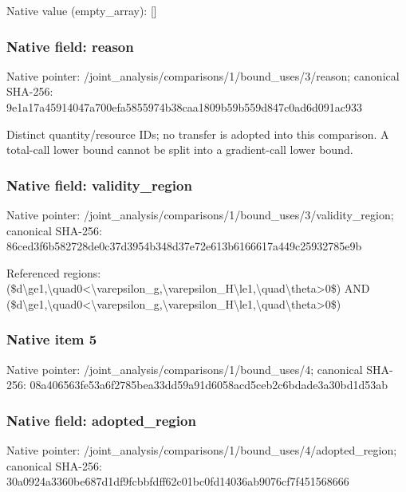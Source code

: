 \documentclass[10pt,a4paper]{article}
\begin{document}
Native value (empty\_\allowbreak{}array): []

\subsubsection{Native field: reason}
Native pointer: /joint\_\allowbreak{}analysis/comparisons/1/bound\_\allowbreak{}uses/3/reason; canonical SHA-256: 9e1a17a45914047a700efa5855974b38caa1809b59b559d847c0ad6d091ac933

\begingroup\raggedright\sloppy Distinct quantity/\allowbreak{}resource IDs;\allowbreak{} no transfer is adopted into this comparison. A total-call lower bound cannot be split into a gradient-call lower bound.\par\endgroup

\subsubsection{Native field: validity\_\allowbreak{}region}
Native pointer: /joint\_\allowbreak{}analysis/comparisons/1/bound\_\allowbreak{}uses/3/validity\_\allowbreak{}region; canonical SHA-256: 86ced3f6b582728de0c37d3954b348d37e72e613b6166617a449c25932785e9b

\begingroup\raggedright\sloppy Referenced regions:\allowbreak{} (\$d\textbackslash{}ge1,\allowbreak{}\textbackslash{}quad0<\textbackslash{}varepsilon\_\allowbreak{}g,\allowbreak{}\textbackslash{}varepsilon\_\allowbreak{}H\textbackslash{}le1,\allowbreak{}\textbackslash{}quad\textbackslash{}theta>0\$) AND (\$d\textbackslash{}ge1,\allowbreak{}\textbackslash{}quad0<\textbackslash{}varepsilon\_\allowbreak{}g,\allowbreak{}\textbackslash{}varepsilon\_\allowbreak{}H\textbackslash{}le1,\allowbreak{}\textbackslash{}quad\textbackslash{}theta>0\$)\par\endgroup

\subsubsection{Native item 5}
Native pointer: /joint\_\allowbreak{}analysis/comparisons/1/bound\_\allowbreak{}uses/4; canonical SHA-256: 08a406563fe53a6f2785bea33dd59a91d6058acd5ceb2c6bdade3a30bd1d53ab

\subsubsection{Native field: adopted\_\allowbreak{}region}
Native pointer: /joint\_\allowbreak{}analysis/comparisons/1/bound\_\allowbreak{}uses/4/adopted\_\allowbreak{}region; canonical SHA-256: 30a0924a3360be687d1df9fcbbfdff62c01bc0fd14036ab9076cf7f451568666
\end{document}

